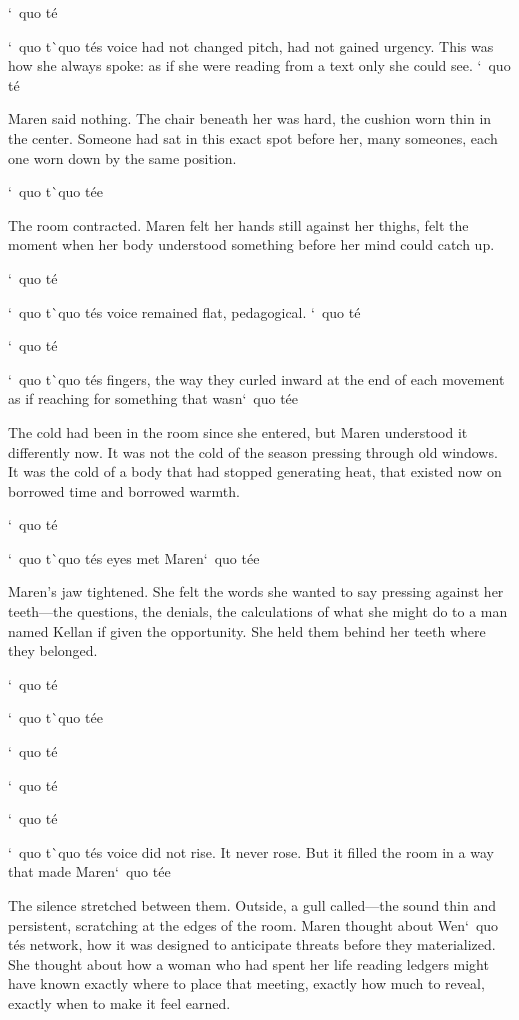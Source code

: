 \documentclass[12pt,letterpaper,openany]{book}
\begin{document}
`\ quo t\'e{}
\par
`\ quo t\`\ quo t\'e{}s voice had not changed pitch, had not gained urgency. This was how she always spoke: as if she were reading from a text only she could see. `\ quo t\'e{}
\par
Maren said nothing. The chair beneath her was hard, the cushion worn thin in the center. Someone had sat in this exact spot before her, many someones, each one worn down by the same position.
\par
`\ quo t\`\ quo t\'e{}e{}
\par
The room contracted. Maren felt her hands still against her thighs, felt the moment when her body understood something before her mind could catch up.
\par
`\ quo t\'e{}
\par
`\ quo t\`\ quo t\'e{}s voice remained flat, pedagogical. `\ quo t\'e{}
\par
`\ quo t\'e{}
\par
`\ quo t\`\ quo t\'e{}s fingers, the way they curled inward at the end of each movement as if reaching for something that wasn`\ quo t\'e{}e{}
\par
The cold had been in the room since she entered, but Maren understood it differently now. It was not the cold of the season pressing through old windows. It was the cold of a body that had stopped generating heat, that existed now on borrowed time and borrowed warmth.
\par
`\ quo t\'e{}
\par
`\ quo t\`\ quo t\'e{}s eyes met Maren`\ quo t\'e{}e{}
\par
Maren's jaw tightened. She felt the words she wanted to say pressing against her teeth—the questions, the denials, the calculations of what she might do to a man named Kellan if given the opportunity. She held them behind her teeth where they belonged.
\par
`\ quo t\'e{}
\par
`\ quo t\`\ quo t\'e{}e{}
\par
`\ quo t\'e{}
\par
`\ quo t\'e{}
\par
`\ quo t\'e{}
\par
`\ quo t\`\ quo t\'e{}s voice did not rise. It never rose. But it filled the room in a way that made Maren`\ quo t\'e{}e{}
\par
The silence stretched between them. Outside, a gull called—the sound thin and persistent, scratching at the edges of the room. Maren thought about Wen`\ quo t\'e{}s network, how it was designed to anticipate threats before they materialized. She thought about how a woman who had spent her life reading ledgers might have known exactly where to place that meeting, exactly how much to reveal, exactly when to make it feel earned.
\end{document}
